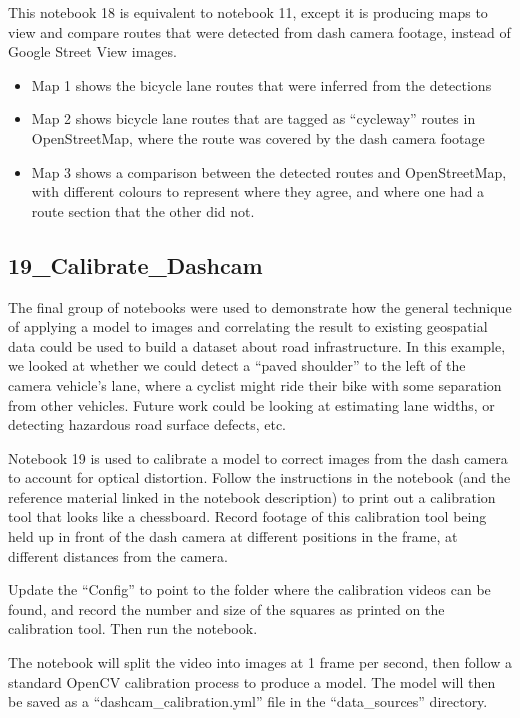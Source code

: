 \documentclass[11pt,twoside]{report}
\begin{document}
This notebook 18 is equivalent to notebook 11, except it is producing maps to view and compare routes that were detected from dash camera footage, instead of Google Street View images.

\begin{itemize}
\item{Map 1 shows the bicycle lane routes that were inferred from the detections}
\item{Map 2 shows bicycle lane routes that are tagged as ``cycleway'' routes in OpenStreetMap, where the route was covered by the dash camera footage}
\item{Map 3 shows a comparison between the detected routes and OpenStreetMap, with different colours to represent where they agree, and where one had a route section that the other did not.}	
\end{itemize}


\subsection{19\_Calibrate\_Dashcam}
\label{a19}

The final group of notebooks were used to demonstrate how the general technique of applying a model to images and correlating the result to existing geospatial data could be used to build a dataset about road infrastructure.  In this example, we looked at whether we could detect a ``paved shoulder'' to the left of the camera vehicle's lane, where a cyclist might ride their bike with some separation from other vehicles.  Future work could be looking at estimating lane widths, or detecting hazardous road surface defects, etc.

Notebook 19 is used to calibrate a model to correct images from the dash camera to account for optical distortion.  Follow the instructions in the notebook (and the reference material linked in the notebook description) to print out a calibration tool that looks like a chessboard.  Record footage of this calibration tool being held up in front of the dash camera at different positions in the frame, at different distances from the camera.

Update the ``Config'' to point to the folder where the calibration videos can be found, and record the number and size of the squares as printed on the calibration tool.  Then run the notebook.

The notebook will split the video into images at 1 frame per second, then follow a standard OpenCV calibration process to produce a model.  The model will then be saved as a ``dashcam\_calibration.yml'' file in the ``data\_sources'' directory.
\end{document}
